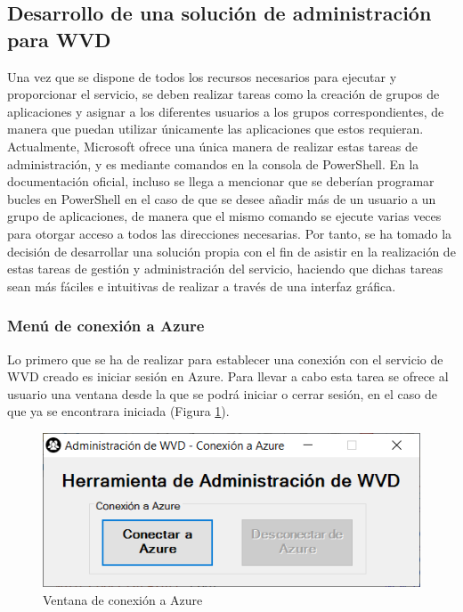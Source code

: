 \clearpage

\subsection{Desarrollo de una solución de administración para \acs{WVD}}
Una vez que se dispone de todos los recursos necesarios para ejecutar y proporcionar el servicio, se deben realizar tareas como la creación de grupos de aplicaciones y asignar a los diferentes usuarios a los grupos correspondientes, de manera que puedan utilizar únicamente las aplicaciones que estos requieran. Actualmente, Microsoft ofrece una única manera de realizar estas tareas de administración, y es mediante comandos en la consola de PowerShell. En la documentación oficial, incluso se llega a mencionar que se deberían programar bucles en PowerShell en el caso de que se desee añadir más de un usuario a un grupo de aplicaciones, de manera que el mismo comando se ejecute varias veces para otorgar acceso a todos las direcciones necesarias. Por tanto, se ha tomado la decisión de desarrollar una solución propia con el fin de asistir en la realización de estas tareas de gestión y administración del servicio, haciendo que dichas tareas sean más fáciles e intuitivas de realizar a través de una interfaz gráfica.

\subsubsection{Menú de conexión a Azure}
Lo primero que se ha de realizar para establecer una conexión con el servicio de \acs{WVD} creado es iniciar sesión en Azure. Para llevar a cabo esta tarea se ofrece al usuario una ventana desde la que se podrá iniciar o cerrar sesión, en el caso de que ya se encontrara iniciada (Figura \ref{fig:main_conex}).

\begin{figure}[h]
  \centering
  \includegraphics[width=0.7\linewidth]{figures/images/main_conex.PNG}
  \caption{Ventana de conexión a Azure}
  \label{fig:main_conex}
\end{figure}

